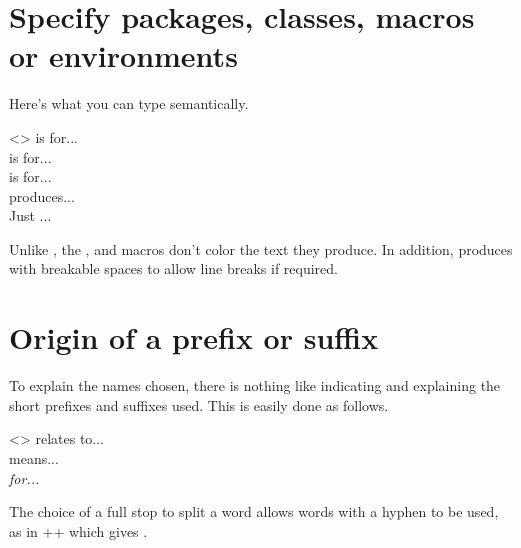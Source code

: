\documentclass{tutodoc}
\begin{document}
\section{Specify packages, classes, macros or environments}

Here's what you can type semantically.


\begin{tdoclatex}<>
 is for...    \\
 is for... \\
 is for... \\
 produces...      \\
Just ...
\end{tdoclatex}


\begin{tdocrem}
    Unlike , the ,  and  macros don't color the text they produce.
    In addition,  produces  with breakable spaces to allow line breaks if required.
\end{tdocrem}


\section{Origin of a prefix or suffix}

To explain the names chosen, there is nothing like indicating and explaining the short prefixes and suffixes used. This is easily done as follows.


\begin{tdoclatex}<>
 relates to...      \\
 means...   \\
\emph{ for...}
\end{tdoclatex}


\begin{tdocrem}
    The choice of a full stop to split a word allows words with a hyphen to be used, as in \tdoclatexin++ which gives .
\end{tdocrem}
\end{document}
